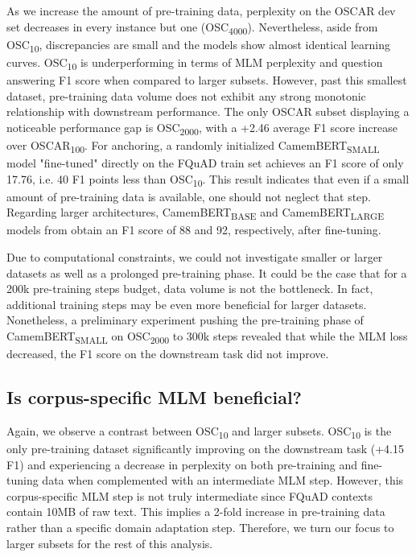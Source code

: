 \documentclass[11pt,a4paper]{article}
\begin{document}
As we increase the amount of pre-training data, perplexity on the OSCAR dev set decreases in every instance but one (OSC\textsubscript{4000}). Nevertheless, aside from OSC\textsubscript{10}, discrepancies are small and the models show almost identical learning curves. OSC\textsubscript{10} is underperforming in terms of MLM perplexity and question answering F1 score when compared to larger subsets. However, past this smallest dataset, pre-training data volume does not exhibit any strong monotonic relationship with downstream performance. The only OSCAR subset displaying a noticeable performance gap is OSC\textsubscript{2000}, with a +2.46 average F1 score increase over OSCAR\textsubscript{100}. For anchoring, a randomly initialized CamemBERT\textsubscript{SMALL} model "fine-tuned" directly on the FQuAD train set achieves an F1 score of only 17.76, i.e. 40 F1 points less than OSC\textsubscript{10}. This result indicates that even if a small amount of pre-training data is available, one should not neglect that step.
Regarding larger architectures, CamemBERT\textsubscript{BASE} and CamemBERT\textsubscript{LARGE} models from \citet{camembert} obtain an F1 score of 88 and 92, respectively, after fine-tuning.

Due to computational constraints, we could not investigate smaller or larger datasets as well as a prolonged pre-training phase. It could be the case that for a 200k pre-training steps budget, data volume is not the bottleneck. In fact, additional training steps may be even more beneficial for larger datasets. Nonetheless, a preliminary experiment pushing the pre-training phase of CamemBERT\textsubscript{SMALL} on OSC\textsubscript{2000} to 300k steps revealed that while the MLM loss decreased, the F1 score on the downstream task did not improve.

\subsection{Is corpus-specific MLM beneficial?}

Again, we observe a contrast between OSC\textsubscript{10} and larger subsets. OSC\textsubscript{10} is the only pre-training dataset significantly improving on the downstream task (+4.15 F1) and experiencing a decrease in perplexity on both pre-training and fine-tuning data when complemented with an intermediate MLM step. However, this corpus-specific MLM step is not truly intermediate since FQuAD contexts contain 10MB of raw text. This implies a 2-fold increase in pre-training data rather than a specific domain adaptation step. Therefore, we turn our focus to larger subsets for the rest of this analysis.
\end{document}
